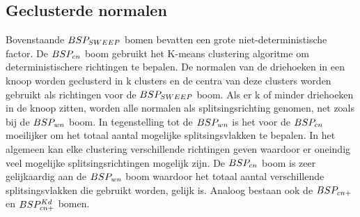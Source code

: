     

    
\subsection{Geclusterde normalen}
    Bovenstaande $BSP_{SWEEP}$ bomen bevatten een grote niet-deterministische factor.
    De $BSP_{cn}$ boom gebruikt het K-means clustering algoritme om deterministischere richtingen te bepalen.
    De normalen van de driehoeken in een knoop worden geclusterd in k clusters en de centra van deze clusters worden gebruikt als richtingen voor de $BSP_{SWEEP}$ boom.
    Als er k of minder driehoeken in de knoop zitten, worden alle normalen als splitsingsrichting genomen, net zoals bij de $BSP_{wn}$ boom.
    In tegenstelling tot de $BSP_{wn}$ is het voor de $BSP_{cn}$ moeilijker om het totaal aantal mogelijke splitsingsvlakken te bepalen.
    In het algemeen kan elke clustering verschillende richtingen geven waardoor er oneindig veel mogelijke splitsingsrichtingen mogelijk zijn.
    De $BSP_{cn}$ boom is zeer gelijkaardig aan de $BSP_{wn}$ boom waardoor het totaal aantal verschillende splitsingsvlakken die gebruikt worden, gelijk is. Analoog bestaan ook de $BSP_{cn+}$ en $BSP^{Kd}_{cn+}$ bomen.






